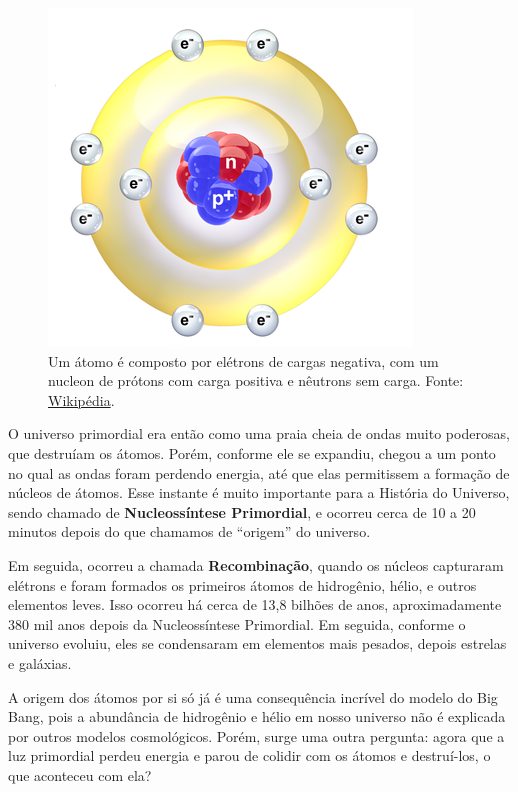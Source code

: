 \begin{multicols}{2}
\begin{figure}[H]
	\centering
	\includegraphics[width=0.9\linewidth]{Figuras/Artigo1/Bohr.png}
	\caption{Um átomo é composto por elétrons de cargas negativa, com um nucleon de prótons com carga positiva e nêutrons sem carga. Fonte: \href{https://en.wikipedia.org/wiki/File:Blausen_0342_ElectronEnergyLevels.png}{Wikipédia}.}
	\label{fig:bohr}
\end{figure}


O universo primordial era então como uma praia cheia de ondas muito poderosas, que destruíam os átomos. Porém, conforme ele se expandiu, chegou a um ponto no qual as ondas foram perdendo energia, até que elas permitissem a formação de núcleos de átomos. Esse instante é muito importante para a História do Universo, sendo chamado de \textbf{Nucleossíntese Primordial}, e ocorreu cerca de 10 a 20 minutos depois do que chamamos de ``origem'' do universo.
	
Em seguida, ocorreu a chamada \textbf{Recombinação}, quando os núcleos capturaram elétrons e foram formados os primeiros átomos de hidrogênio, hélio, e outros elementos leves. Isso  ocorreu há cerca de 13,8 bilhões de anos, aproximadamente 380 mil anos depois da Nucleossíntese Primordial. Em seguida, conforme o universo evoluiu, eles se condensaram em elementos mais pesados, depois estrelas e galáxias.

A origem dos átomos por si só já é uma consequência incrível do modelo do Big Bang, pois a abundância de hidrogênio e hélio em nosso universo não é explicada por outros modelos cosmológicos.  Porém, surge uma outra pergunta: agora que a luz primordial perdeu energia e parou de colidir com os átomos e destruí-los, o que aconteceu com ela?


\end{multicols}
